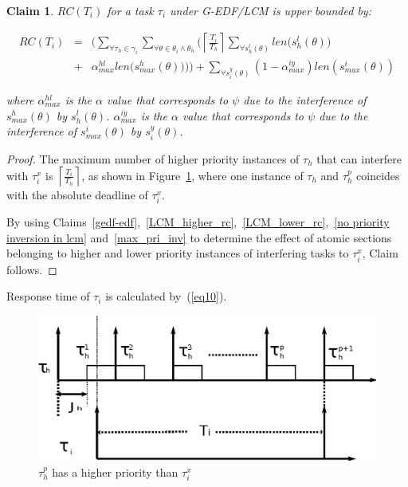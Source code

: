 \documentclass[12pt,english]{report}
\newtheorem{clm}{Claim}
\newtheorem{proof}{Proof}
\begin{document}
\begin{clm}\label{GEDF/LCM response time}
$RC(T_i)$ for a task $\tau_i$ under G-EDF/LCM is upper bounded by:

\begin{eqnarray}
RC(T_i) & = & \Bigg(\sum_{\forall \tau_h \in \gamma_i}\sum_{\forall\theta \in \theta_i \wedge \theta_h}\Bigg(\left\lceil\frac{T_{i}}{T_{h}}\right\rceil\sum_{\forall s_{h}^{l}(\theta)}len\Big(s_{h}^{l}(\theta)\Big)\nonumber\\
& + & \alpha_{max}^{hl}len\Big(s_{max}^{h}(\theta)\Big)\Bigg)\Bigg) + \sum_{\forall s_{i}^{y}(\theta)}\left(1-\alpha_{max}^{iy}\right)len\left(s_{max}^i(\theta)\right)  
\label{eq78}\end{eqnarray}

where $\alpha_{max}^{hl}$ is the $\alpha$ value that corresponds to $\psi$ due to the interference of $s_{max}^h(\theta)$ by $s_h^l(\theta)$. $\alpha_{max}^{iy}$ is the $\alpha$ value that corresponds to $\psi$ due to the interference of $s_{max}^i(\theta)$ by $s_i^y(\theta)$.
\end{clm}

\begin{proof}\normalfont
The maximum number of higher priority instances of $\tau_h$ that can interfere with $\tau_i^x$ is $\left\lceil\frac{T_i}{T_h}\right\rceil$, as shown in Figure~\ref{fig17}, where one instance of $\tau_h$ and $\tau_h^p$ coincides with the absolute deadline of $\tau_i^x$.

By using Claims~\ref{gedf-edf},~\ref{LCM_higher_rc},~\ref{LCM_lower_rc},~\ref{no priority inversion in lcm} and~\ref{max_pri_inv} to determine the effect of atomic sections belonging to higher and lower priority instances of interfering tasks to $\tau_i^x$, Claim follows.
\end{proof}


Response time of $\tau_{i}$ is calculated by~(\ref{eq10}).
\begin{figure}
\begin{centering}
\includegraphics[scale=0.6]{figures/figure18}
\par\end{centering}
\caption{\label{fig17}$\tau_h^p$ has a higher priority than $\tau_i^x$}
\end{figure}
\end{document}
